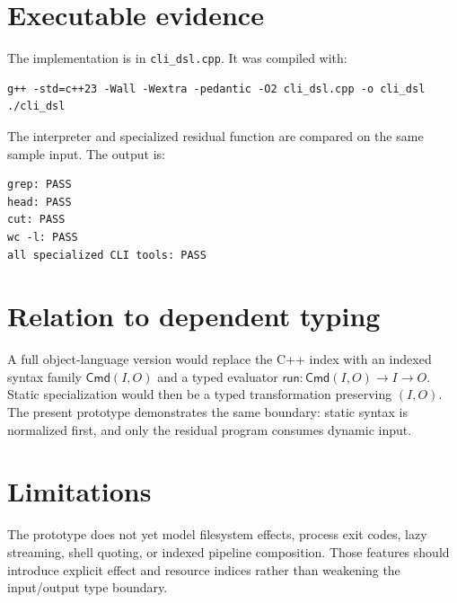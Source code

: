 \documentclass[11pt,a4paper]{article}
\begin{document}
\section{Executable evidence}
The implementation is in \texttt{cli\_dsl.cpp}. It was compiled with:
\begin{verbatim}
g++ -std=c++23 -Wall -Wextra -pedantic -O2 cli_dsl.cpp -o cli_dsl
./cli_dsl
\end{verbatim}
The interpreter and specialized residual function are compared on the same sample input. The output is:
\begin{verbatim}
grep: PASS
head: PASS
cut: PASS
wc -l: PASS
all specialized CLI tools: PASS
\end{verbatim}
\section{Relation to dependent typing}
A full object-language version would replace the C++ index with an indexed syntax family $\mathsf{Cmd}(I,O)$ and a typed evaluator $\mathsf{run}:\mathsf{Cmd}(I,O)\to I\to O$. Static specialization would then be a typed transformation preserving $(I,O)$. The present prototype demonstrates the same boundary: static syntax is normalized first, and only the residual program consumes dynamic input.
\section{Limitations}
The prototype does not yet model filesystem effects, process exit codes, lazy streaming, shell quoting, or indexed pipeline composition. Those features should introduce explicit effect and resource indices rather than weakening the input/output type boundary.
\end{document}
